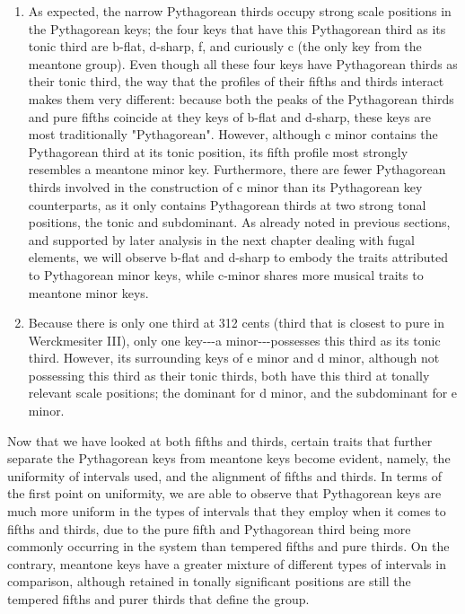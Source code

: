 \begin{enumerate}
\def\labelenumi{\arabic{enumi}.}
\tightlist
\item
  As expected, the narrow Pythagorean thirds occupy strong scale
  positions in the Pythagorean keys; the four keys that have this
  Pythagorean third as its tonic third are b-flat, d-sharp, f, and
  curiously c (the only key from the meantone group). Even though all
  these four keys have Pythagorean thirds as their tonic third, the way
  that the profiles of their fifths and thirds interact makes them very
  different: because both the peaks of the Pythagorean thirds and pure
  fifths coincide at they keys of b-flat and d-sharp, these keys are
  most traditionally "Pythagorean". However, although c minor contains
  the Pythagorean third at its tonic position, its fifth profile most
  strongly resembles a meantone minor key. Furthermore, there are fewer
  Pythagorean thirds involved in the construction of c minor than its
  Pythagorean key counterparts, as it only contains Pythagorean thirds
  at two strong tonal positions, the tonic and subdominant. As already
  noted in previous sections, and supported by later analysis in the
  next chapter dealing with fugal elements, we will observe b-flat and
  d-sharp to embody the traits attributed to Pythagorean minor keys,
  while c-minor shares more musical traits to meantone minor keys.
\item
  Because there is only one third at 312 cents (third that is closest to
  pure in Werckmesiter III), only one key-\/-\/-a minor-\/-\/-possesses
  this third as its tonic third. However, its surrounding keys of e
  minor and d minor, although not possessing this third as their tonic
  thirds, both have this third at tonally relevant scale positions; the
  dominant for d minor, and the subdominant for e minor.
\end{enumerate}

Now that we have looked at both fifths and thirds, certain traits that
further separate the Pythagorean keys from meantone keys become evident,
namely, the uniformity of intervals used, and the alignment of fifths
and thirds. In terms of the first point on uniformity, we are able to
observe that Pythagorean keys are much more uniform in the types of
intervals that they employ when it comes to fifths and thirds, due to
the pure fifth and Pythagorean third being more commonly occurring in
the system than tempered fifths and pure thirds. On the contrary,
meantone keys have a greater mixture of different types of intervals in
comparison, although retained in tonally significant positions are still
the tempered fifths and purer thirds that define the group.

